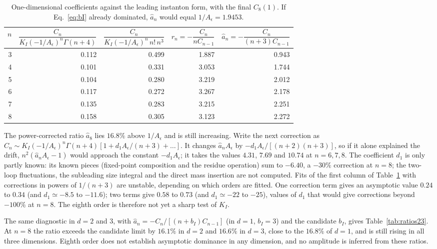 \documentclass[11pt,a4paper]{article}
\numberwithin{equation}{section}
\newcommand{\Ae}{A_\epsilon}
\begin{document}
\begin{table}[htbp]\centering\small
\begin{tabular}{@{}r r r r r@{}}
\toprule
$n$ & $\dfrac{C_n}{K_I(-1/\Ae)^n\Gamma(n+4)}$ & $\dfrac{C_n}{K_I(-1/\Ae)^n\,n!\,n^3}$ &
$r_n=-\dfrac{C_n}{nC_{n-1}}$ & $\widehat a_n=-\dfrac{C_n}{(n+3)C_{n-1}}$\\ \midrule
3 & 0.112 & 0.499 & 1.887 & 0.943\\
4 & 0.101 & 0.331 & 3.053 & 1.744\\
5 & 0.104 & 0.280 & 3.219 & 2.012\\
6 & 0.117 & 0.272 & 3.267 & 2.178\\
7 & 0.135 & 0.283 & 3.215 & 2.251\\
8 & 0.158 & 0.305 & 3.123 & 2.272\\
\bottomrule
\end{tabular}
\caption{One-dimensional coefficients against the leading instanton form, with the
final $C_8(1)$. If Eq.~\eqref{eq:bI} already dominated, $\widehat a_n$ would equal
$1/\Ae=1.9453$.}
\label{tab:mismatch}
\end{table}

The power-corrected ratio $\widehat a_8$ lies $16.8\%$ above $1/\Ae$ and is still
increasing. Write the next correction as
$C_n\sim K_I(-1/\Ae)^n\Gamma(n+4)[1+d_1\Ae/(n+3)+\dots]$. It changes $\widehat a_n\Ae$ by
$-d_1\Ae/[(n+2)(n+3)]$, so if it alone explained the drift, $n^2(\widehat a_n\Ae-1)$ would
approach the constant $-d_1\Ae$; it takes the values $4.31$, $7.69$ and $10.74$ at $n=6,7,8$.
The coefficient $d_1$ is only partly known: its known pieces (fixed-point composition and
the residue operation) sum to $-6.40$, a $-30\%$ correction at $n=8$; the two-loop
fluctuations, the subleading size integral and the direct mass insertion are not computed.
Fits of the first column of Table~\ref{tab:mismatch} with corrections in powers of $1/(n+3)$
are unstable, depending on which orders are fitted. One correction term gives an asymptotic
value $0.24$ to $0.34$ (and $d_1\simeq-8.5$ to $-11.6$); two terms give $0.58$ to $0.73$ (and
$d_1\simeq-22$ to $-25$), values of $d_1$ that would give corrections beyond $-100\%$ at
$n=8$. The eighth order is therefore not yet a sharp test of $K_I$.

The same diagnostic in $d=2$ and $3$, with $\widehat a_n=-C_n/[(n+b_I)C_{n-1}]$ (in $d=1$,
$b_I=3$) and the candidate $b_I$, gives Table~\ref{tab:ratios23}. At $n=8$ the ratio exceeds the candidate limit by
$16.1\%$ in $d=2$ and $16.6\%$ in $d=3$, close to the $16.8\%$ of $d=1$, and is still
rising in all three dimensions. Eighth order does not establish asymptotic dominance in
any dimension, and no amplitude is inferred from these ratios.
\end{document}
